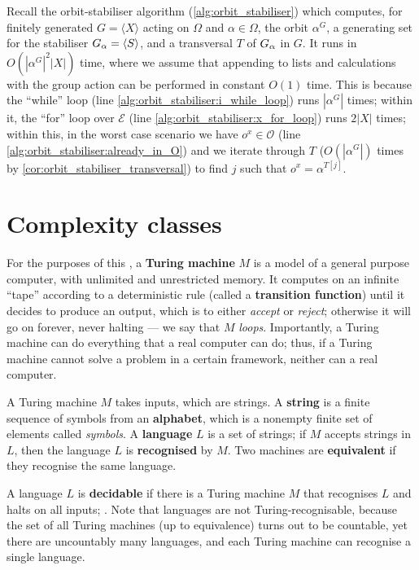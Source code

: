 \begin{example}\label{eg:alg:orbit_stabiliser:complexity}
    Recall the orbit-stabiliser algorithm (\autoref{alg:orbit_stabiliser}) which computes, for finitely generated $G = \langle X \rangle$ acting on $\Omega$ and $\alpha \in \Omega$, the orbit $\alpha^G$, a generating set for the stabiliser $\added{2}{G_\alpha} = \langle S \rangle$, and a transversal $T$ of $\added{2}{G_\alpha}$ in $G$. It runs in $O(|\alpha^G|^2|X|)$ time, where we assume that appending to lists and calculations with the group action can be performed in constant $O(1)$ time. This is because the ``while'' loop (line \ref{alg:orbit_stabiliser:i_while_loop}) runs $|\alpha^G|$ times; within it, the ``for'' loop over $\mathcal{E}$ (line \ref{alg:orbit_stabiliser:x_for_loop}) runs $2|X|$ times; within this, in the worst case scenario we have $o^x \in \mathcal{O}$ (line \ref{alg:orbit_stabiliser:already_in_O}) and we iterate through $T$ ($O(|\alpha^G|)$ times by \autoref{cor:orbit_stabiliser_transversal}) to find $j$ such that $o^x = \alpha^{T[j]}$.
\end{example}

\section{Complexity classes}

For the purposes of this \thesis, a \textbf{Turing machine} $M$ is a model of a general purpose computer, with unlimited and unrestricted memory. It computes on an infinite ``tape'' according to a deterministic rule (called a \textbf{transition function}) until it decides to produce an output, which is to either \textit{accept} or \textit{reject}; otherwise it will go on forever, never halting --- we say that $M$ \textit{loops}. Importantly, a Turing machine can do everything that a real computer can do; thus, if a Turing machine cannot solve a problem in a certain framework, neither can a real computer.

A Turing machine $M$ takes inputs, which are strings. A \textbf{string} is a finite sequence of symbols from an \textbf{alphabet}, which is a nonempty finite set of elements called \textit{symbols}. A \textbf{language} $L$ is a set of strings; if $M$ accepts strings in $L$, then the language $L$ is \textbf{recognised} by $M$. Two machines are \textbf{equivalent} if they recognise the same language.

A language $L$ is \textbf{decidable} if there is a Turing machine $M$ that recognises $L$ and halts on all inputs; . Note that  languages are not Turing-recognisable, because the set of all Turing machines (up to equivalence) turns out to be countable, yet there are uncountably many languages, and each Turing machine can recognise a single language. 


